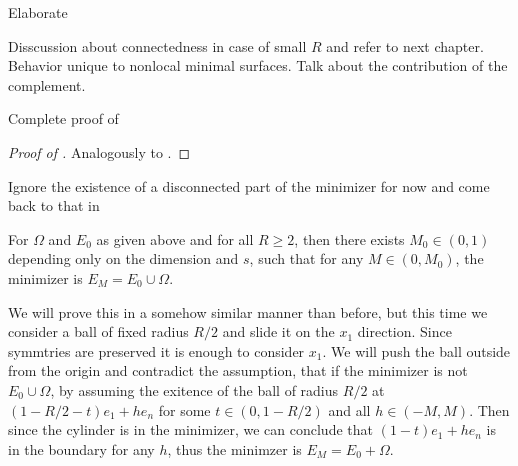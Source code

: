 \begin{TODO}
	Elaborate
\end{TODO}
Disscussion about connectedness in case of small \( R \) and refer to next chapter.
Behavior unique to nonlocal minimal surfaces.\newline
Talk about the contribution of the complement.

\begin{TODO}
	Complete proof of 
\end{TODO}
\begin{proof}[Proof of ]
	Analogously to .
\end{proof}



\begin{TODO}
	Ignore the existence of a disconnected part of the minimizer for now and come back to
	that in 
\end{TODO}

\begin{theorem}
	\label{thm:105}
	For \( \Omega \) and \( E_0 \) as given above and for all \( R \geq 2 \), then there exists
	\( M_0 \in (0, 1) \) depending only on the dimension and \( s \), such that for any \( M \in
	(0, M_0) \), the minimizer is \( E_M = E_0 \cup \Omega \).
\end{theorem}

We will prove this in a somehow similar manner than before, but this time we consider a
ball of fixed radius \( R/2 \) and slide it on the \( x_1 \) direction. Since symmtries
are preserved it is enough to consider \( x_1 \). We will push the ball outside from the
origin and contradict the assumption, that if the minimizer is not \( E_0 \cup \Omega \),
by assuming the exitence of the ball of radius \( R/2 \) at \( (1 - R/2 - t)e_1 + h e_n
\) for some \( t \in (0, 1 - R/2) \) and all \( h \in (- M, M) \). Then since the cylinder is
in the minimizer, we can conclude that \( (1 - t)e_1 + h e_n \) is in the boundary for
any \( h \), thus the minimzer is \( E_M = E_0 + \Omega \).

